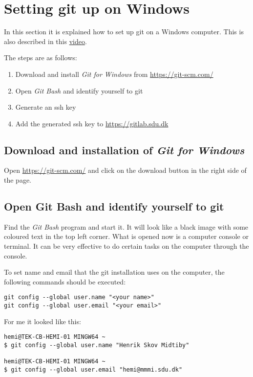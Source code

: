 \section{Setting git up on Windows}

In this section it is explained how to set up git on 
a Windows computer.
This is also described in this \href{https://tekvideo.sdu.dk/t/henrikmidtiby/E-MAIP-2020/2020/1/blok04/4}{video}.

The steps are as follows:
\begin{enumerate}
\item		Download and install \emph{Git for Windows} from \url{https://git-scm.com/}
\item		Open \emph{Git Bash} and identify yourself to git
\item		Generate an ssh key
\item 	Add the generated ssh key to \url{https://gitlab.sdu.dk}
\end{enumerate}

\subsection{Download and installation of \emph{Git for Windows}}

Open \url{https://git-scm.com/} and click on the download button
in the right side of the page.

\subsection{Open Git Bash and identify yourself to git}

Find the \emph{Git Bash} program and start it.
It will look like a black image with some coloured text in the 
top left corner.
What is opened now is a computer console or terminal.
It can be very effective to do certain tasks on the computer through the console.

To set name and email that the git installation uses on the 
computer, the following commands should be executed:
\begin{verbatim}
git config --global user.name "<your name>"
git config --global user.email "<your email>"
\end{verbatim}

For me it looked like this:
\begin{verbatim}
hemi@TEK-CB-HEMI-01 MINGW64 ~
$ git config --global user.name "Henrik Skov Midtiby"

hemi@TEK-CB-HEMI-01 MINGW64 ~
$ git config --global user.email "hemi@mmmi.sdu.dk"
\end{verbatim}

